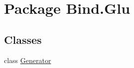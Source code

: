 \hypertarget{namespace_bind_1_1_glu}{
\section{Package Bind.Glu}
\label{namespace_bind_1_1_glu}
}
\subsection*{Classes}
\begin{DoxyCompactItemize}
\item 
class \hyperlink{class_bind_1_1_glu_1_1_generator}{Generator}
\end{DoxyCompactItemize}
